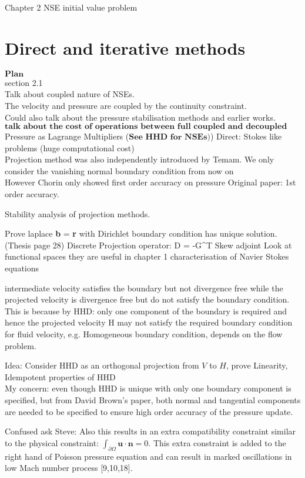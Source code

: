 Chapter 2
NSE initial value problem 

\section*{Direct and iterative methods}
$\textbf{Plan}$\\
section 2.1\\
Talk about coupled nature of NSEs.\\
The velocity and pressure are coupled by the continuity constraint.\\ 
Could also talk about the pressure stabilisation methods and earlier works.\\
$\textbf{talk about the cost of operations between full coupled and decoupled methods!}$
Pressure as Lagrange Multipliers ($\textbf{See HHD for NSEs)}$)
Direct: Stokes like problems (huge computational cost)\\
Projection method was also independently introduced by Temam.
We only consider the vanishing normal boundary condition from now on\\
However Chorin only showed first order accuracy on pressure
Original paper: 1st order accuracy.

Stability analysis of projection methods.

Prove laplace \textbf{b} = \textbf{r} with Dirichlet boundary condition has unique solution.
(Thesis page 28) Discrete Projection operator: D = -G^T Skew adjoint
Look at functional spaces they are useful in chapter 1 characterisation of Navier Stokes equations

intermediate velocity satisfies the boundary but not divergence free while the projected velocity is divergence free but do not satisfy the boundary condition.
This is because by HHD: only one component of the boundary is required and hence the projected velocity \in H may not satisfy the required boundary condition for fluid velocity, e.g. Homogeneous boundary condition, depends on the flow problem.

Idea: Consider HHD as an orthogonal projection from $V$ to $H$, prove Linearity, Idempotent properties of HHD\\
My concern: even though HHD is unique with only one boundary component is specified, but from David Brown's paper, both normal and tangential components are needed to be specified to ensure high order accuracy of the pressure update.

Confused ask Steve: Also this results in an extra compatibility constraint similar to the physical constraint: $\int_{\partial \Omega} \textbf{u} \cdot \textbf{n} = 0$. This extra constraint is added to the right hand of Poisson pressure equation and can result in marked oscillations in low Mach number process [9,10,18]. 

